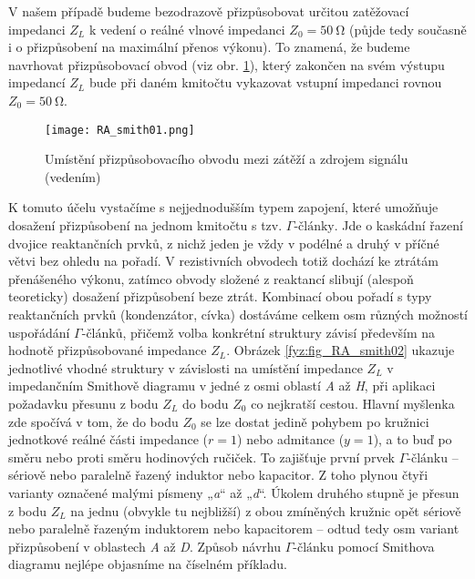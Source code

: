         V našem případě budeme bezodrazově přizpůsobovat určitou zatěžovací impedanci \(Z_L\) k vedení o 
        reálné vlnové impedanci \(Z_0 = \SI{50}{\ohm}\) (půjde tedy současně i o přizpůsobení na maximální 
        přenos výkonu). To znamená, že budeme navrhovat přizpůsobovací obvod (viz obr. 
        \ref{fyz:fig_RA_smith01}), který zakončen na svém  výstupu impedancí \(Z_L\) bude při daném kmitočtu 
        vykazovat vstupní impedanci rovnou \(Z_0 = \SI{50}{\ohm}\).
        \begin{figure}[ht!] %
          \centering
          \texttt{[image: RA\_smith01.png]}
          \caption{Umístění přizpůsobovacího obvodu mezi zátěží a zdrojem signálu (vedením)}
          \label{fyz:fig_RA_smith01} 
        \end{figure}
        K tomuto účelu vystačíme s nejjednodušším typem zapojení, které umožňuje dosažení přizpůsobení na 
        jednom kmitočtu s tzv. \(\Gamma\text{-články}\). Jde o kaskádní řazení dvojice reaktančních prvků, z 
        nichž jeden je vždy v podélné a druhý v příčné větvi bez ohledu na pořadí. V rezistivních obvodech 
        totiž dochází ke ztrátám přenášeného výkonu, zatímco obvody složené z reaktancí slibují (alespoň 
        teoreticky) dosažení přizpůsobení beze ztrát. Kombinací obou pořadí s typy reaktančních prvků 
        (kondenzátor, cívka) dostáváme celkem osm různých možností uspořádání \(\Gamma\text{-článků}\), 
        přičemž volba konkrétní struktury závisí především na hodnotě přizpůsobované impedance \(Z_L\). 
        Obrázek \ref{fyz:fig_RA_smith02}  ukazuje jednotlivé vhodné struktury v závislosti na umístění 
        impedance \(Z_L\) v impedančním Smithově diagramu v jedné z osmi oblastí \emph{A} až \emph{H}, při 
        aplikaci požadavku přesunu z bodu \(Z_L\) do bodu \(Z_0\) co nejkratší cestou. Hlavní myšlenka zde 
        spočívá v tom, že do bodu \(Z_0\) se lze dostat jedině pohybem po kružnici jednotkové reálné části 
        impedance (\(r = 1\)) nebo admitance (\(y = 1\)), a to buď po směru nebo proti směru hodinových 
        ručiček. To zajišťuje první prvek \(\Gamma\text{-článku}\) – sériově nebo paralelně řazený induktor 
        nebo kapacitor. Z toho plynou čtyři varianty označené malými písmeny „\emph{a}“ až „\emph{d}“. Úkolem 
        druhého stupně je přesun z bodu \(Z_L\) na jednu (obvykle tu nejbližší) z obou zmíněných kružnic opět 
        sériově nebo paralelně řazeným induktorem nebo kapacitorem – odtud tedy osm variant přizpůsobení v 
        oblastech \emph{A} až \emph{D}. Způsob návrhu \(\Gamma\text{-článku}\) pomocí Smithova diagramu 
        nejlépe objasníme na číselném příkladu.
  
